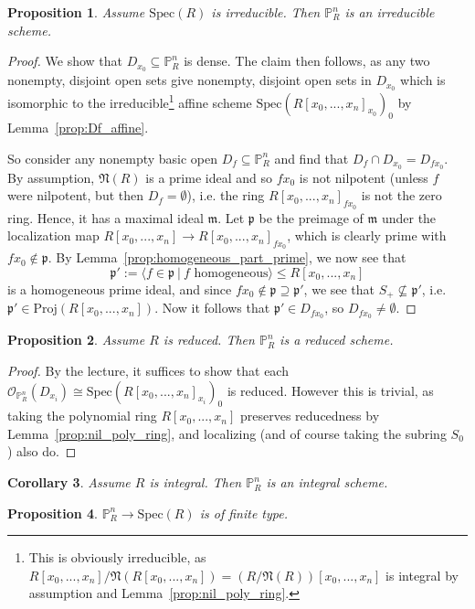 \documentclass{scrartcl}
\renewcommand{\P}{\mathbb{P}}
\newcommand{\p}{\mathfrak{p}}
\newcommand{\m}{\mathfrak{m}}
\renewcommand{\m}{\mathfrak{m}}
\newcommand{\Nil}{\mathfrak{N}}
\newcommand{\Spec}{\mathrm{Spec}}
\newcommand{\Proj}{\mathrm{Proj}}
\renewcommand{\O}{\mathcal{O}}
\newtheorem{prop}{Proposition}
\newtheorem{corollary}[prop]{Corollary}
\theoremstyle{definition}
\begin{document}
\begin{prop}
    Assume $\Spec(R)$ is irreducible.
    Then $\P_R^n$ is an irreducible scheme.
\end{prop}
\begin{proof}
    We show that $D_{x_0} \subseteq \P_R^n$ is dense.
    The claim then follows, as any two nonempty, disjoint open sets give nonempty, disjoint open sets in $D_{x_0}$ which is isomorphic to the 
    irreducible\footnote{This is obviously irreducible, as $R[x_0, ..., x_n]/\Nil(R[x_0, ..., x_n]) = (R/\Nil(R))[x_0, ..., x_n]$ is integral by assumption and Lemma~\ref{prop:nil_poly_ring}.}
    affine scheme $\Spec(R[x_0, ..., x_n]_{x_0})_0$ by Lemma~\ref{prop:Df_affine}.

    So consider any nonempty basic open $D_f \subseteq \P_R^n$ and find that $D_f \cap D_{x_0} = D_{fx_0}$.
    By assumption, $\Nil(R)$ is a prime ideal and so $fx_0$ is not nilpotent (unless $f$ were nilpotent, but then $D_f = \emptyset$), i.e. the ring $R[x_0, ..., x_n]_{fx_0}$ is not the zero ring.
    Hence, it has a maximal ideal $\m$.
    Let $\p$ be the preimage of $\m$ under the localization map $R[x_0, ..., x_n] \to R[x_0, ..., x_n]_{fx_0}$, which is clearly prime with $fx_0 \notin \p$.
    By Lemma~\ref{prop:homogeneous_part_prime}, we now see that
    \begin{equation*}
        \p' := \langle f \in \p \ | \ \text{$f$ homogeneous} \rangle \leq R[x_0, ..., x_n]
    \end{equation*}
    is a homogeneous prime ideal, and since $fx_0 \notin \p \supseteq \p'$, we see that $S_+ \not\subseteq \p'$, i.e. $\p' \in \Proj(R[x_0, ..., x_n])$.
    Now it follows that $\p' \in D_{fx_0}$, so $D_{fx_0} \neq \emptyset$.
\end{proof}
\begin{prop}
    Assume $R$ is reduced.
    Then $\P_R^n$ is a reduced scheme.
\end{prop}
\begin{proof}
    By the lecture, it suffices to show that each $\O_{\P_R^n}(D_{x_i}) \cong \Spec(R[x_0, ..., x_n]_{x_i})_0$ is reduced.
    However this is trivial, as taking the polynomial ring $R[x_0, ..., x_n]$ preserves reducedness by Lemma~\ref{prop:nil_poly_ring}, and localizing (and of course taking the subring $S_0$) also do.
\end{proof}
\begin{corollary}
    Assume $R$ is integral.
    Then $\P_R^n$ is an integral scheme.
\end{corollary}
\begin{prop}
    \label{prop:p_quasi_compact}
    $\P_R^n \to \Spec(R)$ is of finite type.
\end{prop}
\end{document}

